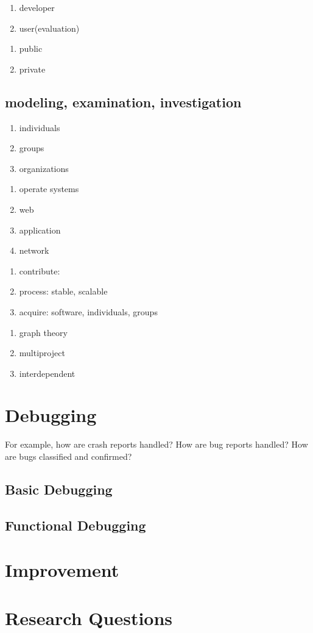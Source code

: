 \documentclass[draftclsnofoot,journal,onecolumn,12pt]{IEEEtran}
\begin{document}
\begin{enumerate}
  \item developer
  \item user(evaluation)
\end{enumerate}

\begin{enumerate}
  \item public
  \item private
\end{enumerate}

\subsection{modeling, examination, investigation}

\begin{enumerate}
  \item individuals
  \item groups
  \item organizations
\end{enumerate}

\begin{enumerate}
  \item operate systems
  \item web
  \item application
  \item network
\end{enumerate}

\begin{enumerate}
  \item contribute:
  \item process: stable, scalable
  \item acquire: software, individuals, groups
\end{enumerate}

\begin{enumerate}
  \item graph theory
  \item multiproject
  \item interdependent
\end{enumerate}

\section{Debugging}

For example, how are crash reports handled? How are bug reports handled? How are bugs classified and confirmed?

\subsection{Basic Debugging}

\subsection{Functional Debugging}

\section{Improvement}

\section{Research Questions}

\nocite{*}

\renewcommand\refname{References}


\end{document}
